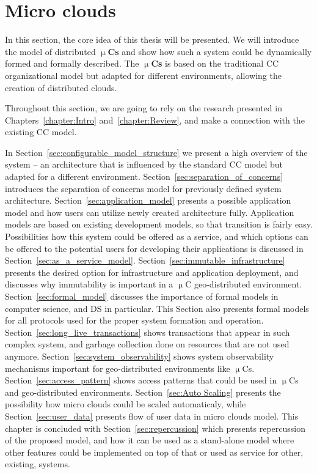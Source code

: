 \chapter{Micro clouds}\label{chapter:Micro_clouds}
%
In this section, the core idea of this thesis will be presented. We will introduce the model of distributed \textbf{$\upmu$Cs} and show how such a system could be dynamically formed and formally described. The \textbf{$\upmu$Cs} is based on the traditional CC organizational model but adapted for different environments, allowing the creation of distributed clouds.

Throughout this section, we are going to rely on the research presented in Chapters~\ref{chapter:Intro} and~\ref{chapter:Review}, and make a connection with the existing CC model.

In Section~\ref{sec:configurable_model_structure} we present a high overview of the system -- an architecture that is influenced by the standard CC model but adapted for a different environment. Section~\ref{sec:separation_of_concerns} introduces the separation of concerns model for previously defined system architecture. Section~\ref{sec:application_model} presents a possible application model and how users can utilize newly created architecture fully. Application models are based on existing development models, so that transition is fairly easy. Possibilities how this system could be offered as a service, and which options can be offered to the potential users for developing their applications is discussed in Section~\ref{sec:as_a_service_model}. Section~\ref{sec:immutable_infrastructure} presents the desired option for infrastructure and application deployment, and discusses why immutability is important in a $\upmu$C geo-distributed environment. Section~\ref{sec:formal_model} discusses the importance of formal models in computer science, and DS in particular. This Section also presents formal models for all protocols used for the proper system formation and operation. Section~\ref{sec:long_live_transactions} shows transactions that appear in such complex system, and garbage collection done on resources that are not used anymore. Section~\ref{sec:system_observability} shows system observability mechanisms important for geo-distributed environments like $\upmu$Cs. Section~\ref{sec:access_pattern} shows access patterns that could be used in $\upmu$Cs and geo-distributed environments. 
Section~\ref{sec:Auto Scaling} presents the possibility how micro clouds could be scaled automaticaly, while Section~\ref{sec:user_data} presents flow of user data in micro clouds model. This chapter is concluded with Section~\ref{sec:repercussion} which presents repercussion of the proposed model, and how it can be used as a stand-alone model where other features could be implemented on top of that or used as service for other, existing, systems.
%
%
